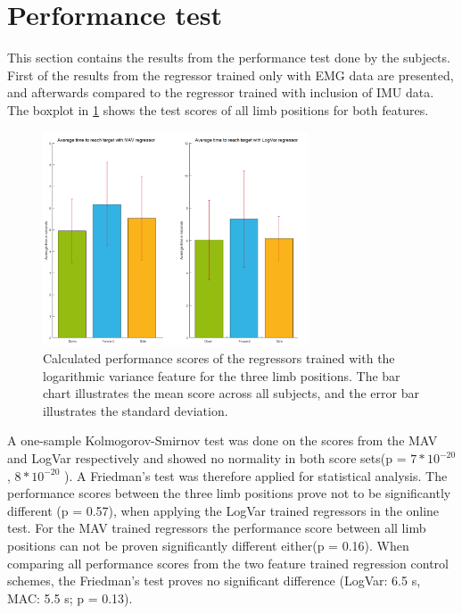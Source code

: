 \section{Performance test}
This section contains the results from the performance test done by the subjects. First of the results from the regressor trained only with EMG data are presented, and afterwards compared to the regressor trained with inclusion of IMU data. The boxplot in \ref{fig:GotItTime} shows the test scores of all limb positions for both features.

\begin{figure}[H]
	\includegraphics[width=0.7\textwidth]{figures/results/GotItTime}  %
	\caption{Calculated performance scores of the regressors trained with the logarithmic variance feature for the three limb positions. The bar chart illustrates the mean score across all subjects, and the error bar illustrates the standard deviation.}
	\label{fig:GotItTime}  %
\end{figure}

A one-sample Kolmogorov-Smirnov test was done on the scores from the MAV and LogVar respectively and showed no normality in both score sets(p = $7 * 10^{-20}$, $8 * 10^{-20}$ ). A Friedman's test was therefore applied for statistical analysis. The performance scores between the three limb positions prove not to be significantly different (p = 0.57), when applying the LogVar trained regressors in the online test. For the MAV trained regressors the performance score between all limb positions can not be proven significantly different either(p = 0.16). When comparing all performance scores from the two feature trained regression control schemes, the Friedman's test proves no significant difference (LogVar: 6.5 s, MAC: 5.5 s; p = 0.13).

